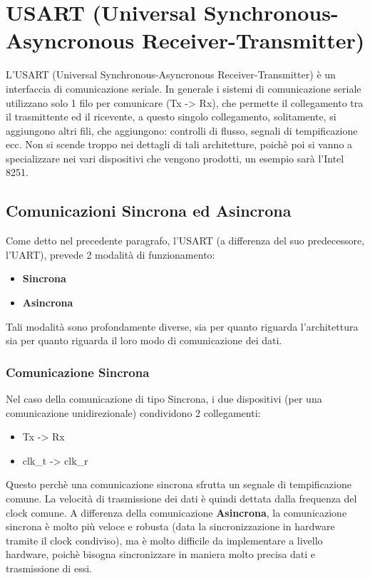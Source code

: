 \newpage
\section{USART (Universal Synchronous-Asyncronous Receiver-Transmitter)}

L'USART (Universal Synchronous-Asyncronous Receiver-Transmitter) è un interfaccia di comunicazione seriale. In generale i sistemi di comunicazione seriale utilizzano solo 1 filo per comunicare (Tx -> Rx), che permette il collegamento tra il trasmittente ed il ricevente, a questo singolo collegamento, solitamente, si aggiungono altri fili, che aggiungono: controlli di flusso, segnali di tempificazione ecc.
Non si scende troppo nei dettagli di tali architetture, poichè poi si vanno a specializzare nei vari dispositivi che vengono prodotti, un esempio sarà l'Intel 8251.

\subsection{Comunicazioni Sincrona ed Asincrona}
Come detto nel precedente paragrafo, l'USART (a differenza del suo predecessore, l'UART), prevede 2 modalità di funzionamento:
\begin{itemize}
    \item \textbf{Sincrona}
    \item \textbf{Asincrona}
\end{itemize}
Tali modalità sono profondamente diverse, sia per quanto riguarda l'architettura sia per quanto riguarda il loro modo di comunicazione dei dati.

\subsubsection{Comunicazione Sincrona}
Nel caso della comunicazione di tipo Sincrona, i due dispositivi (per una comunicazione unidirezionale) condividono 2 collegamenti:
\begin{itemize}
    \item Tx -> Rx
    \item clk\_t -> clk\_r
\end{itemize}

Questo perchè una comunicazione sincrona sfrutta un segnale di tempificazione comune. La velocità di trasmissione dei dati è quindi dettata dalla frequenza del clock comune. A differenza della comunicazione \textbf{Asincrona}, la comunicazione sincrona è molto più veloce e robusta (data la sincronizzazione in hardware tramite il clock condiviso), ma è molto difficile da implementare a livello hardware, poichè bisogna sincronizzare in maniera molto precisa dati e trasmissione di essi.

